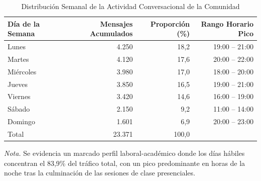 \begin{table}[htbp]
  \centering
  \small
  \caption{Distribución Semanal de la Actividad Conversacional de la Comunidad}
  \label{tab:actividad_diasemana}
  \begin{tabular}{lrrr}
    \toprule
    Día de la Semana & Mensajes Acumulados & Proporción (\%) & Rango Horario Pico \\
    \midrule
    Lunes            & 4.250               & 18,2            & 19:00 -- 21:00     \\
    Martes           & 4.120               & 17,6            & 20:00 -- 22:00     \\
    Miércoles        & 3.980               & 17,0            & 18:00 -- 20:00     \\
    Jueves           & 3.850               & 16,5            & 19:00 -- 21:00     \\
    Viernes          & 3.420               & 14,6            & 16:00 -- 19:00     \\
    Sábado           & 2.150               & 9,2             & 11:00 -- 14:00     \\
    Domingo          & 1.601               & 6,9             & 20:00 -- 23:00     \\
    \midrule
    Total            & 23.371              & 100,0           &                    \\
    \bottomrule
  \end{tabular}
  \vspace{4pt}
  \begin{minipage}{0.92\textwidth}
    \footnotesize
    \textit{Nota.} Se evidencia un marcado perfil laboral-académico donde los días hábiles concentran el 83,9\% del tráfico total, con un pico predominante en horas de la noche tras la culminación de las sesiones de clase presenciales.
  \end{minipage}
\end{table}
